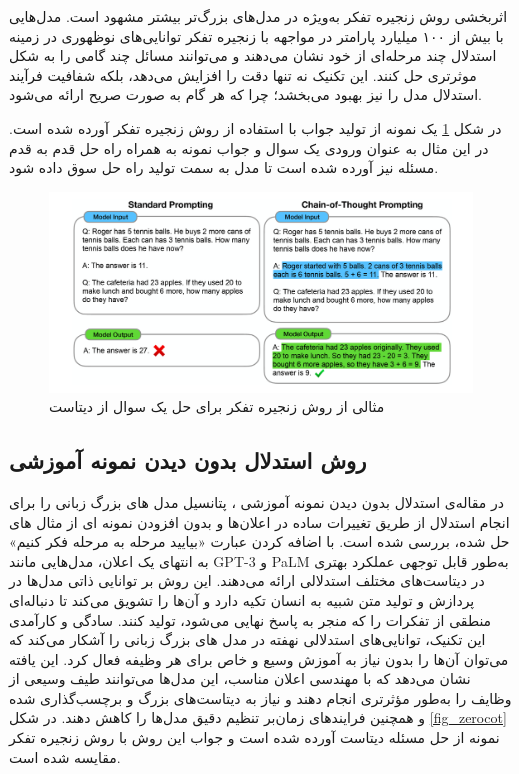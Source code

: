 اثربخشی روش زنجیره تفکر به‌ویژه در مدل‌های بزرگ‌تر بیشتر مشهود است. مدل‌هایی با بیش از ۱۰۰ میلیارد پارامتر در مواجهه با زنجیره تفکر توانایی‌های نوظهوری در زمینه استدلال چند مرحله‌ای از خود نشان می‌دهند و می‌توانند مسائل چند گامی را به شکل موثرتری حل کنند. این تکنیک نه تنها دقت را افزایش می‌دهد، بلکه شفافیت فرآیند استدلال مدل را نیز بهبود می‌بخشد؛ چرا که هر گام به صورت صریح ارائه می‌شود.

در شکل \ref{fig_cot} یک نمونه از تولید جواب با استفاده از روش زنجیره تفکر آورده شده است. در این مثال به عنوان ورودی یک سوال و جواب نمونه به همراه راه حل قدم به قدم مسئله نیز آورده شده است تا مدل به سمت تولید راه حل سوق داده شود.
\begin{figure}[!t]
	\centering
	\includegraphics[width=140mm]{images/Cot}
	\caption{مثالی از روش زنجیره تفکر برای حل یک سوال از دیتاست }
	\label{fig_cot}
\end{figure}

\subsection{روش استدلال بدون دیدن نمونه آموزشی} 
در مقاله‌ی استدلال بدون دیدن نمونه آموزشی
 \cite{LLMzeroshot}
، پتانسیل مدل های بزرگ زبانی را برای انجام استدلال  از طریق تغییرات ساده در اعلان‌ها و بدون افزودن نمونه ای از مثال های حل شده، بررسی شده است. با اضافه کردن عبارت «بیایید مرحله به مرحله فکر کنیم» به انتهای یک اعلان، مدل‌هایی مانند GPT-3 و PaLM
\cite{palm2}
به‌طور قابل توجهی عملکرد بهتری در دیتاست‌های مختلف استدلالی ارائه می‌دهند. 
این روش بر توانایی ذاتی مدل‌ها در پردازش و تولید متن شبیه به انسان تکیه دارد و آن‌ها را تشویق می‌کند تا دنباله‌ای منطقی از تفکرات را که منجر به پاسخ نهایی می‌شود، تولید کنند. سادگی و کارآمدی این تکنیک، توانایی‌های استدلالی نهفته در مدل های بزرگ زبانی را آشکار می‌کند که می‌توان آن‌ها را بدون نیاز به آموزش وسیع و خاص برای هر وظیفه فعال کرد.
این یافته نشان می‌دهد که با مهندسی اعلان مناسب، این مدل‌ها می‌توانند طیف وسیعی از وظایف را به‌طور مؤثرتری انجام دهند و نیاز به دیتاست‌های بزرگ و برچسب‌گذاری شده و همچنین فرایندهای زمان‌بر تنظیم دقیق مدل‌ها را کاهش دهند. در شکل \ref{fig_zerocot} نمونه از حل مسئله دیتاست  آورده شده است و جواب این روش با روش زنجیره تفکر مقایسه شده است.

